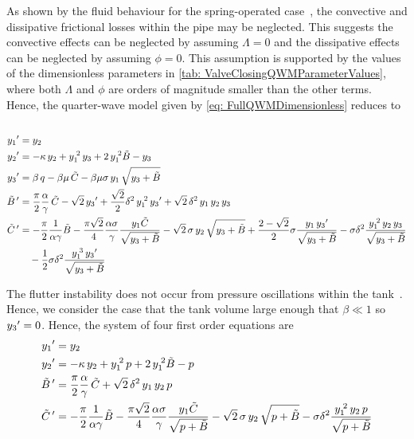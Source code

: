 As shown by the fluid behaviour for the spring-operated case~\cite{Hos2015ModelPipe}, the convective and dissipative frictional losses within the pipe may be neglected. This suggests the convective effects can be neglected by assuming $\Lambda = 0$ and the dissipative effects can be neglected by assuming $\phi = 0$. This assumption is supported by the values of the dimensionless parameters in \cref{tab: ValveClosingQWMParameterValues}, where both $\Lambda$ and $\phi$ are orders of magnitude smaller than the other terms. Hence, the quarter-wave model given by \cref{eq: FullQWMDimensionless} reduces to
~
\begin{equation*}
\begin{split}
    \dash{y_1} &= y_2 \\
    \dash{y_2} &= - \kappa \, y_2 + y_1\power{2} \, y_3 + 2 \, y_1\power{2} \tilde{B} - y_3 \\
    \dash{y_3} &= \beta \, q - \beta \mu \, \tilde{C} - \beta \mu \sigma \, y_1 \, \sqrt{y_3 + \tilde{B}} \\
    \dash{\tilde{B}\,} &= \frac{\pi}{2} \frac{\alpha}{\gamma} \, \tilde{C} - \sqrt{2} \, \dash{y_3} + \frac{\sqrt{2}}{2} \delta^2 \, y_1\power{2} \, \dash{y_3} + \sqrt{2} \, \delta^2 \, y_1 \, y_2 \, y_3 \\
    \dash{\tilde{C}\,} &=
    - \frac{\pi}{2} \frac{1}{\alpha \gamma} \tilde{B}
    - \frac{\pi \sqrt{2}}{4} \frac{\alpha \sigma}{\gamma} \frac{y_1 \tilde{C}}{\sqrt{y_3 + \tilde{B}}}
    - \sqrt{2} \, \sigma \, y_2 \, \sqrt{y_3 + \tilde{B}}
    + \frac{2-\sqrt{2}}{2} \sigma \frac{y_1 \, \dash{y_3}}{\sqrt{y_3 + \tilde{B}}}
    - \sigma \delta^2 \frac{y_1\power{2} \, y_2 \, y_3}{\sqrt{y_3 + \tilde{B}}}
    \\ & \quad %
    - \frac{1}{2} \sigma \delta^2 \frac{y_1\power{3} \, \dash{y_3}}{\sqrt{y_3 + \tilde{B}}} 
\end{split}
\end{equation*}

The flutter instability does not occur from pressure oscillations within the tank~\cite{Allison2015TestingValves}. Hence, we consider the case that the tank volume large enough that $\beta \ll 1$ so $y_3{'} = 0$. Hence, the system of four first order equations are
~
\begin{equation} \label{eq: QWFixedTankPressure}
\begin{split}
    y_1{'} &= y_2 \\
    y_2{'} &= - \kappa \, y_2 + y_1^{\;2} \, p + 2 \, y_1^{\;2} \tilde{B} - p \\
    \tilde{B}\,{'} &= \frac{\pi}{2} \frac{\alpha}{\gamma} \, \tilde{C} + \sqrt{2} \, \delta^2 \, y_1 \, y_2 \, p \\
    \tilde{C}\,{'} &=
    - \frac{\pi}{2} \frac{1}{\alpha \gamma} \tilde{B}
    - \frac{\pi \sqrt{2}}{4} \frac{\alpha \sigma}{\gamma} \frac{y_1 \tilde{C}}{\sqrt{p + \tilde{B}}}
    - \sqrt{2} \, \sigma \, y_2 \, \sqrt{p + \tilde{B}}
    - \sigma \delta^2 \frac{y_1^{\;2} \, y_2 \, p}{\sqrt{p + \tilde{B}}}
\end{split}
\end{equation}

